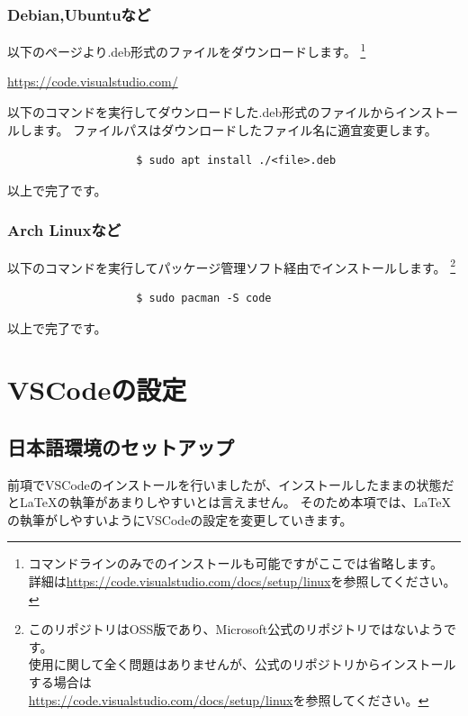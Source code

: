 			\subsubsection{Debian,Ubuntuなど}
				以下のページより.deb形式のファイルをダウンロードします。
				\footnote{コマンドラインのみでのインストールも可能ですがここでは省略します。
					\\詳細は\url{https://code.visualstudio.com/docs/setup/linux}を参照してください。}
				\begin{mdframed}[style=shadow]
					\url{https://code.visualstudio.com/}
				\end{mdframed}
				以下のコマンドを実行してダウンロードした.deb形式のファイルからインストールします。
				ファイルパスはダウンロードしたファイル名に適宜変更します。
				\begin{mdframed}[style=bash]
					\begin{verbatim}
					$ sudo apt install ./<file>.deb
					\end{verbatim}
				\end{mdframed}
				以上で完了です。

			\subsubsection{Arch Linuxなど}
				以下のコマンドを実行してパッケージ管理ソフト経由でインストールします。
				\footnote{このリポジトリはOSS版であり、Microsoft公式のリポジトリではないようです。
					\\使用に関して全く問題はありませんが、公式のリポジトリからインストールする場合は
					\\\url{https://code.visualstudio.com/docs/setup/linux}を参照してください。}
				\begin{mdframed}[style=bash]
					\begin{verbatim}
					$ sudo pacman -S code
					\end{verbatim}
				\end{mdframed}
				以上で完了です。

	\section{VSCodeの設定}
		\subsection{日本語環境のセットアップ}
			前項でVSCodeのインストールを行いましたが、インストールしたままの状態だと\LaTeX の執筆があまりしやすいとは言えません。
			そのため本項では、\LaTeX の執筆がしやすいようにVSCodeの設定を変更していきます。

